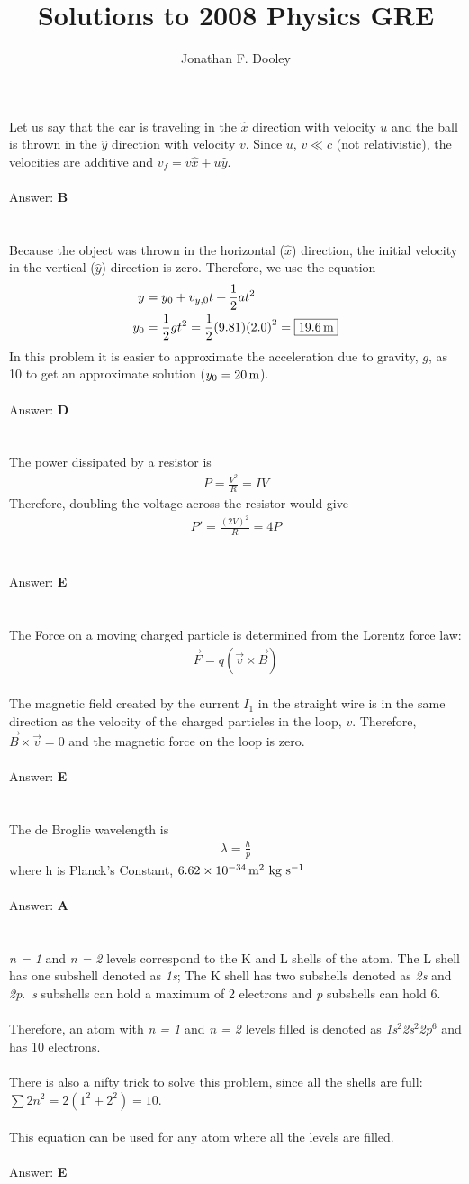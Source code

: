 \documentclass[12pt]{article}
\title{Solutions to 2008 Physics GRE}
\author{Jonathan F. Dooley}
\newcommand{\Answer}[1]{Answer: \textbf{#1}}
\newcommand{\Problem}[3]{
    \setcounter{section}{#1}
    \addtocounter{section}{-1}
    \section{}
    #3\\\\
    \Answer{#2}
}
\begin{document}


\Problem{1}{B}{
Let us say that the car is traveling in the $\hat{x}$ direction with velocity $u$ and the ball is thrown in the $\hat{y}$ direction with velocity $v$.
Since $u$, $v \ll c$ (not relativistic), the velocities are additive and $v_f = v \hat{x} + u \hat{y}$.
}

\Problem{2}{D}{
Because the object was thrown in the horizontal ($\hat{x}$) direction, the initial velocity in the vertical ($\hat{y}$) direction is zero. Therefore, we use the equation
%
\begin{align}
y &=  y_{0} + v_{y,0} t + \frac{1}{2} a t^2\\
y_{0} &= \frac{1}{2} g t^2 = \frac{1}{2} (9.81) {(2.0)}^2 = \boxed{19.6\,\text{m}}\nonumber
\end{align}
%
In this problem it is easier to approximate the acceleration due to gravity, $g$, as 10 to get an approximate solution ($y_{0} = 20\,\text{m}$).
}

\Problem{3}{E}{
The power dissipated by a resistor is
%
\begin{align}
P  = \frac{V^2}{R} = IV
\end{align}
%
Therefore, doubling the voltage across the resistor would give
%
\begin{align}
P' = \frac{{(2V)}^2}{R} = \boxed{4 P}\nonumber
\end{align}
}


\Problem{4}{E}{
The Force on a moving charged particle is determined from the Lorentz force law:
\begin{align}
\textbf{$\vec{F}$} = q (\textbf{$\vec{v}$}\times\textbf{$\vec{B}$})
\end{align}
\\
The magnetic field created by the current $I_{1}$ in the straight wire is in the same direction as the velocity of the charged particles in the loop, ${v}$. Therefore, $\vec{B} \times \vec{v}=0$ and the magnetic force on the loop is zero.
}

\Problem{5}{A}{
The de Broglie wavelength is
\begin{align}
\lambda = \frac{h}{p}
\end{align}
where h is Planck's Constant, $6.62\times 10^{-34}\,\text{m$^2$ kg s$^{-1}$}$
}

\Problem{6}{E}{
\textit{n = 1} and \textit{n = 2} levels correspond to the K and L shells of the atom. The L shell has one subshell denoted as \textit{1s}; The K shell has two subshells denoted as \textit{2s} and \textit{2p}.~\textit{s} subshells can hold a maximum of 2 electrons and \textit{p} subshells can hold 6.\\\\Therefore, an atom with \textit{n = 1} and \textit{n = 2} levels filled is denoted as \textit{1s$^2$2s$^2$2p$^6$} and has 10 electrons.\\\\
There is also a nifty trick to solve this problem, since all the shells are full: $\sum2n^{2} = 2(1^{2}+2^{2}) = 10$. \\\\This equation can be used for any atom where all the levels are filled.
}
\end{document}

